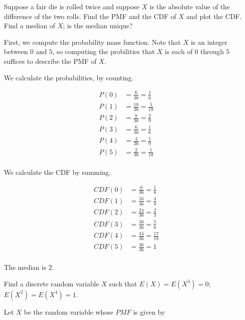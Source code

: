 \begin{problem}[Handout 6, \# 5]
  Suppose a fair die is rolled twice and suppose \(X\) is the absolute
  value of the difference of the two rolls. Find the PMF and the CDF of
  \(X\) and plot the CDF. Find a median of \(X\); is the median unique?
\end{problem}
\begin{solution}

First, we compute the probability mass function. Note that $X$ is an integer between $0$ and $5$, so computing the probilities that $X$ is each of $0$ through $5$ suffices to describe the PMF of $X$.

We calculate the probabilities, by counting.

\begin{align*}
P(0) &= \frac{6}{36} = \frac{1}{6}\\
P(1) &= \frac{10}{36} = \frac{5}{18}\\
P(2) &= \frac{8}{36} = \frac{2}{9}\\
P(3) &= \frac{6}{36} = \frac{1}{6}\\
P(4) &= \frac{4}{36} = \frac{1}{9}\\
P(5) &= \frac{2}{36} = \frac{1}{18}\\
\end{align*}

We calculate the CDF by summing.

\begin{align*}
CDF(0) &= \frac{6}{36} = \frac{1}{6}\\
CDF(1) &= \frac{16}{36} = \frac{4}{9}\\
CDF(2) &= \frac{24}{36} = \frac{2}{3}\\
CDF(3) &= \frac{30}{36} = \frac{5}{6}\\
CDF(4) &= \frac{34}{36} = \frac{17}{18}\\
CDF(5) &= \frac{36}{36} = 1\\
\end{align*}

The median is $2$.

\end{solution}
\newpage

\begin{problem}[Handout 6, \# 7]
  Find a discrete random variable \(X\) such that \(E(X)=E(X^3)=0\);
  \(E(X^2)=E(X^4)=1\).
\end{problem}
\begin{solution}

Let $X$ be the random variable whose $PMF$ is given by 

\end{solution}
\newpage

